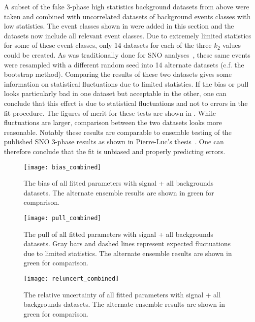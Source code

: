 A subset of the fake 3-phase high statistics background datasets from above were taken and combined with uncorrelated datasets of background events classes with low statistics.
The event classes shown in  were added in this section and the datasets now include all relevant event classes.
Due to extremely limited statistics for some of these event classes, only 14 datasets for each of the three $k_2$ values could be created.
As was traditionally done for SNO analyses~\cite{plthesis}, these same events were resampled with a different random seed into 14 alternate datasets (c.f. the bootstrap method).
Comparing the results of these two datasets gives some information on statistical fluctuations due to limited statistics.
If the bias or pull looks particularly bad in one dataset but acceptable in the other, one can conclude that this effect is due to statistical fluctuations and not to errors in the fit procedure.
The figures of merit for these tests are shown in . 
While fluctuations are larger, comparison between the two datasets looks more reasonable. 
Notably these results are comparable to ensemble testing of the published SNO 3-phase results as shown in Pierre-Luc's thesis~\cite{plthesis}.
One can therefore conclude that the fit is unbiased and properly predicting errors.

\begin{figure}
\centering
\texttt{[image: bias\_combined]}
\caption{
The bias of all fitted parameters with signal + all backgrounds datasets. The alternate ensemble results are shown in green for comparison.
}
\label{fig:allbg_bias}
\end{figure}

\begin{figure}
\centering
\texttt{[image: pull\_combined]}
\caption{
The pull of all fitted parameters with signal + all backgrounds datasets. Gray bars and dashed lines represent expected fluctuations due to limited statistics. The alternate ensemble results are shown in green for comparison.
}
\label{fig:allbg_pull}
\end{figure}

\begin{figure}
\centering
\texttt{[image: reluncert\_combined]}
\caption{
The relative uncertainty of all fitted parameters with signal + all backgrounds datasets. The alternate ensemble results are shown in green for comparison.
}
\label{fig:allbg_reluncert}
\end{figure}

